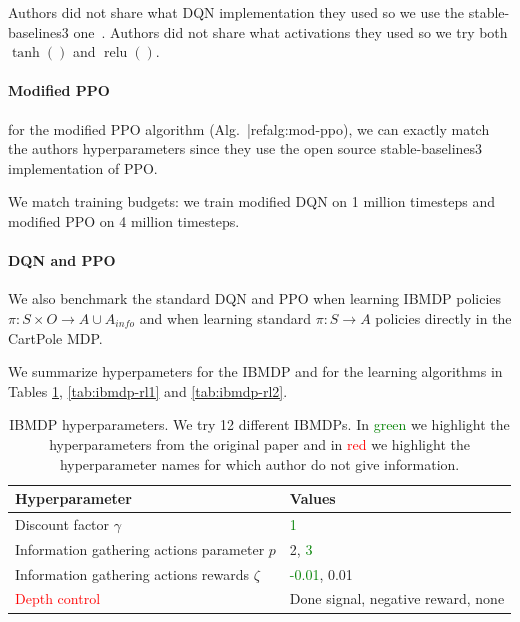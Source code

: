 Authors did not share what DQN implementation they used so we use the stable-baselines3 one~\cite{stable-baselines3}.
Authors did not share what activations they used so we try both $\operatorname{tanh}()$ and $\operatorname{relu}()$. 

\paragraph{Modified PPO} for the modified PPO algorithm (Alg.~|ref{alg:mod-ppo}), we can exactly match the authors hyperparameters since they use the open source stable-baselines3 implementation of PPO.

We match training budgets: we train modified DQN on 1 million timesteps and modified PPO on 4 million timesteps.

\paragraph{DQN and PPO} We also benchmark the standard DQN and PPO when learning IBMDP policies $\pi:S\times O\rightarrow A\cup A_{info}$ and when learning standard $\pi:S\rightarrow A$ policies directly in the CartPole MDP.

We summarize hyperpameters for the IBMDP and for the learning algorithms in Tables \ref{tab:ibmdp-params}, \ref{tab:ibmdp-rl1} and \ref{tab:ibmdp-rl2}.

\begin{table}[h]
    \centering
    \caption{IBMDP hyperparameters. We try 12 different IBMDPs. In \textcolor{green}{green} we highlight the hyperparameters from the original paper and in \textcolor{red}{red} we highlight the hyperparameter names for which author do not give information.}\label{tab:ibmdp-params}
    \begin{tabular}{ll}
    \toprule
    \textbf{Hyperparameter} & \textbf{Values}\\
    \midrule
    Discount factor $\gamma$ & \textcolor{green}{1} \\
    Information gathering actions parameter $p$ & 2, \textcolor{green}{3} \\
    Information gathering actions rewards $\zeta$ & \textcolor{green}{-0.01}, 0.01 \\
    \textcolor{red}{Depth control} & Done signal, negative reward, none \\ 
    \bottomrule
    \end{tabular}
    \end{table}

